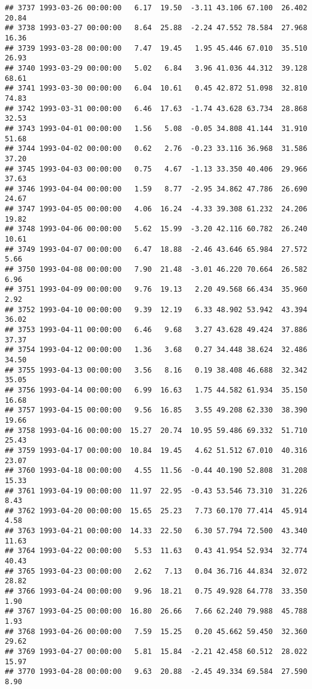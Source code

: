 \documentclass{article}\usepackage{graphicx, color}
\makeatletter
\newenvironment{kframe}{%
 \def\at@end@of@kframe{}%
 \ifinner\ifhmode%
  \def\at@end@of@kframe{\end{minipage}}%
  \begin{minipage}{\columnwidth}%
 \fi\fi%
 \def\FrameCommand##1{\hskip\@totalleftmargin \hskip-\fboxsep
 \colorbox{shadecolor}{##1}\hskip-\fboxsep
     \hskip-\linewidth \hskip-\@totalleftmargin \hskip\columnwidth}%
 \MakeFramed {\advance\hsize-\width
   \@totalleftmargin\z@ \linewidth\hsize
   \@setminipage}}%
 {\par\unskip\endMakeFramed%
 \at@end@of@kframe}
\newenvironment{knitrout}{}{} %
\makeatother
\begin{document}
\begin{knitrout}
\begin{kframe}
\begin{verbatim}
## 3737 1993-03-26 00:00:00   6.17  19.50  -3.11 43.106 67.100  26.402  20.84
## 3738 1993-03-27 00:00:00   8.64  25.88  -2.24 47.552 78.584  27.968  16.36
## 3739 1993-03-28 00:00:00   7.47  19.45   1.95 45.446 67.010  35.510  26.93
## 3740 1993-03-29 00:00:00   5.02   6.84   3.96 41.036 44.312  39.128  68.61
## 3741 1993-03-30 00:00:00   6.04  10.61   0.45 42.872 51.098  32.810  74.83
## 3742 1993-03-31 00:00:00   6.46  17.63  -1.74 43.628 63.734  28.868  32.53
## 3743 1993-04-01 00:00:00   1.56   5.08  -0.05 34.808 41.144  31.910  51.68
## 3744 1993-04-02 00:00:00   0.62   2.76  -0.23 33.116 36.968  31.586  37.20
## 3745 1993-04-03 00:00:00   0.75   4.67  -1.13 33.350 40.406  29.966  37.63
## 3746 1993-04-04 00:00:00   1.59   8.77  -2.95 34.862 47.786  26.690  24.67
## 3747 1993-04-05 00:00:00   4.06  16.24  -4.33 39.308 61.232  24.206  19.82
## 3748 1993-04-06 00:00:00   5.62  15.99  -3.20 42.116 60.782  26.240  10.61
## 3749 1993-04-07 00:00:00   6.47  18.88  -2.46 43.646 65.984  27.572   5.66
## 3750 1993-04-08 00:00:00   7.90  21.48  -3.01 46.220 70.664  26.582   6.96
## 3751 1993-04-09 00:00:00   9.76  19.13   2.20 49.568 66.434  35.960   2.92
## 3752 1993-04-10 00:00:00   9.39  12.19   6.33 48.902 53.942  43.394  36.02
## 3753 1993-04-11 00:00:00   6.46   9.68   3.27 43.628 49.424  37.886  37.37
## 3754 1993-04-12 00:00:00   1.36   3.68   0.27 34.448 38.624  32.486  34.50
## 3755 1993-04-13 00:00:00   3.56   8.16   0.19 38.408 46.688  32.342  35.05
## 3756 1993-04-14 00:00:00   6.99  16.63   1.75 44.582 61.934  35.150  16.68
## 3757 1993-04-15 00:00:00   9.56  16.85   3.55 49.208 62.330  38.390  19.66
## 3758 1993-04-16 00:00:00  15.27  20.74  10.95 59.486 69.332  51.710  25.43
## 3759 1993-04-17 00:00:00  10.84  19.45   4.62 51.512 67.010  40.316  23.07
## 3760 1993-04-18 00:00:00   4.55  11.56  -0.44 40.190 52.808  31.208  15.33
## 3761 1993-04-19 00:00:00  11.97  22.95  -0.43 53.546 73.310  31.226   8.43
## 3762 1993-04-20 00:00:00  15.65  25.23   7.73 60.170 77.414  45.914   4.58
## 3763 1993-04-21 00:00:00  14.33  22.50   6.30 57.794 72.500  43.340  11.63
## 3764 1993-04-22 00:00:00   5.53  11.63   0.43 41.954 52.934  32.774  40.43
## 3765 1993-04-23 00:00:00   2.62   7.13   0.04 36.716 44.834  32.072  28.82
## 3766 1993-04-24 00:00:00   9.96  18.21   0.75 49.928 64.778  33.350   1.90
## 3767 1993-04-25 00:00:00  16.80  26.66   7.66 62.240 79.988  45.788   1.93
## 3768 1993-04-26 00:00:00   7.59  15.25   0.20 45.662 59.450  32.360  29.62
## 3769 1993-04-27 00:00:00   5.81  15.84  -2.21 42.458 60.512  28.022  15.97
## 3770 1993-04-28 00:00:00   9.63  20.88  -2.45 49.334 69.584  27.590   8.90

\end{verbatim}
\end{kframe}
\end{knitrout}
\end{document}
